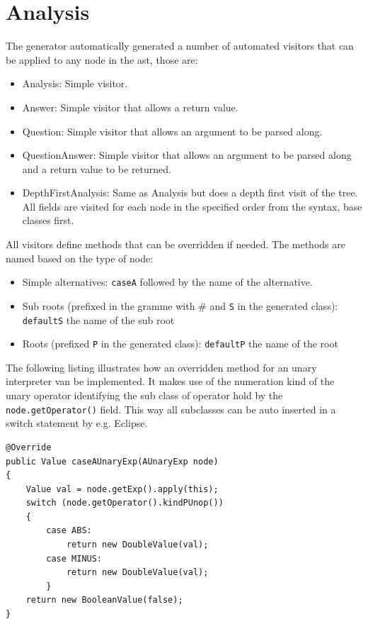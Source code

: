\documentclass{overturerepchap}
\begin{document}
\newpage
\section{Analysis}

The generator automatically generated a number of automated visitors that can be applied to any node in the ast, those are:

\begin{itemize}
\item Analysis: Simple visitor.
\item Answer: Simple visitor that allows a return value.
\item Question: Simple visitor that allows an argument to be parsed along.
\item QuestionAnswer: Simple visitor that allows an argument to be parsed along and a return value to be returned.
\item DepthFirstAnalysis: Same as Analysis but does a depth first visit of the tree. All fields are visited for each node in the specified order from the syntax, base classes first.
\end{itemize}

All visitors define methods that can be overridden if needed. The methods are named based on the type of node:
\begin{itemize}
\item Simple alternatives: \texttt{caseA} followed by the name of the alternative.
\item Sub roots (prefixed in the gramme with \# and \texttt{S} in the generated class): \texttt{defaultS} the name of the sub root
\item Roots (prefixed \texttt{P} in the generated class): \texttt{defaultP} the name of the root
\end{itemize} 

The following listing illustrates how an overridden method for an unary interpreter van be implemented. It makes use of the numeration kind of the unary operator identifying the sub class of operator hold by the \texttt{node.getOperator()} field. This way all subclasses can be auto inserted in a switch statement by e.g. Eclipse.

\lstset{language=Java,basicstyle=\footnotesize\ttfamily}
\begin{lstlisting}
@Override
public Value caseAUnaryExp(AUnaryExp node)
{
	Value val = node.getExp().apply(this);
	switch (node.getOperator().kindPUnop())
	{
		case ABS:
			return new DoubleValue(val);
		case MINUS:
			return new DoubleValue(val);
		}
	return new BooleanValue(false);
}
\end{lstlisting}
\end{document}

